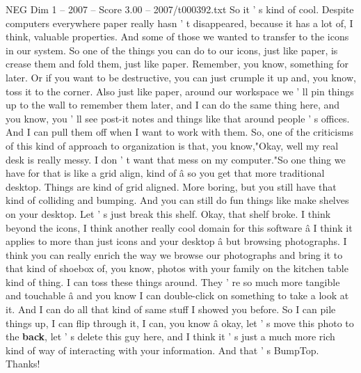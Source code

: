 \begin{textsample}{NEG Dim 1 – 2007 – Score 3.00 – 2007/t000392.txt}
So it ' s kind of cool.
Despite computers everywhere paper really hasn ' t disappeared, because it has a lot of, I think, valuable properties.
And some of those we wanted to transfer to the icons in our system.
So one of the things you can do to our icons, just like paper, is crease them and fold them, just like paper.
Remember, you know, something for later.
Or if you want to be destructive, you can just crumple it up and, you know, toss it to the corner.
Also just like paper, around our workspace we ' ll pin things up to the wall to remember them later, and I can do the same thing here, and you know, you ' ll see post-it notes and things like that around people ' s offices.
And I can pull them off when I want to work with them.
So, one of the criticisms of this kind of approach to organization is that, you know,"Okay, well my real desk is really messy.
I don ' t want that mess on my computer."So one thing we have for that is like a grid align, kind of â so you get that more traditional desktop.
Things are kind of grid aligned.
More boring, but you still have that kind of colliding and bumping.
And you can still do fun things like make shelves on your desktop.
Let ' s just break this shelf.
Okay, that shelf broke.
I think beyond the icons, I think another really cool domain for this software â I think it applies to more than just icons and your desktop â but browsing photographs.
I think you can really enrich the way we browse our photographs and bring it to that kind of shoebox of, you know, photos with your family on the kitchen table kind of thing.
I can toss these things around.
They ' re so much more tangible and touchable â and you know I can double-click on something to take a look at it.
And I can do all that kind of same stuff I showed you before.
So I can pile things up, I can flip through it, I can, you know â okay, let ' s move this photo to the \textbf{back}, let ' s delete this guy here, and I think it ' s just a much more rich kind of way of interacting with your information.
And that ' s BumpTop.
Thanks!

\end{textsample}
